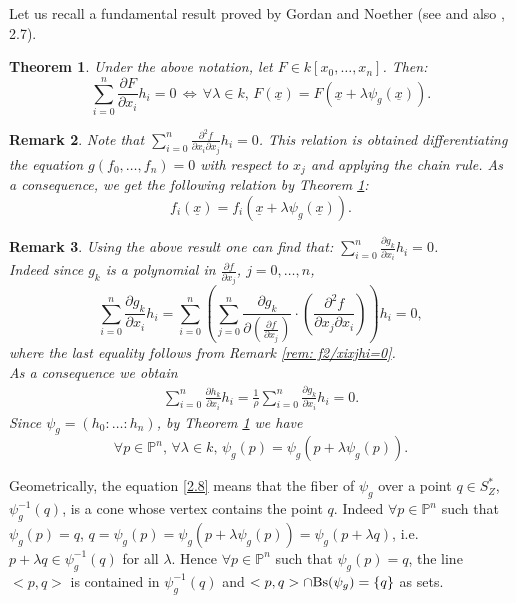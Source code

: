 \documentclass[11pt,a4paper]{amsart}
\newtheorem{theorem}{Theorem}[section]
\newtheorem{rem}[theorem]{Remark}
\begin{document}
\medskip
Let us recall a fundamental result proved by Gordan and Noether (see \cite{Gordan Noether} and also \cite{Lossen}, 2.7).


\begin{theorem}\label{theorem: partial diff }
Under the above notation, let $F\in k[x_0,\ldots ,x_n]$. Then:
\begin{equation}\label{2.7}
\sum_{i=0}^n\frac{\partial F}{\partial x_i}h_i=0\,
\Leftrightarrow\, \forall\lambda\in k, \, F(\underline{x})=F(\underline{x}+\lambda\psi_g(\underline{x})).
\end{equation}
\end{theorem}

\begin{rem}\label{rem: f2/xixjhi=0}{\em
Note that $\sum_{i=0}^n\frac{\partial ^2f}{\partial x_i\partial
x_j}h_i=0$. This relation is obtained differentiating the equation
$g(f_0,\ldots,f_n)=0$ with respect to $x_j$ and applying the chain
rule. As a consequence, we get the following relation by Theorem
\ref{theorem: partial diff }:
\begin{equation}\label{2.5}
   f_i(\underline{x})=f_i(\underline{x}+\lambda\psi_g(\underline{x})).
\end{equation}
}\end{rem}

\begin{rem}\label{rem2.8}{\em Using the above result one can find that:
$\sum_{i=0}^n\frac{\partial g_k}{\partial x_i}h_i=0$.\\
Indeed since $g_k$ is a polynomial in $\frac{\partial f}{\partial
x_j}$, $j=0,\ldots, n$,
$$\sum_{i=0}^n\frac{\partial g_k}{\partial x_i}h_i=\sum_{i=0}^n\left(\sum_{j=0}^n\frac{\partial g_k}{\partial (\frac{\partial f}{\partial x_j})}\cdot \left(\frac{\partial^2f}{\partial x_j \partial x_i}\right)\right)h_i=0,$$
where the last equality follows from Remark \ref{rem:
f2/xixjhi=0}.\\
As a consequence we obtain
\begin{eqnarray}\label{eq: hk/dxi=0}\sum_{i=0}^n\frac{\partial h_k}{\partial
x_i}h_i=\frac{1}{\rho}\sum_{i=0}^n\frac{\partial g_k}{\partial
x_i}h_i=0.\end{eqnarray} Since $\psi_g=(h_0:\ldots: h_n)$, by
Theorem \ref{theorem: partial diff } we have
\begin{equation}\label{2.8}
\forall p\in\mathbb{P}^n,\,  \forall\lambda\in k,\,  \psi_g(p)=\psi_g(p+\lambda\psi_g(p)).
\end{equation}}\end{rem}
Geometrically, the equation \eqref{2.8} means that the fiber of
$\psi_g$ over a point $q\in S^*_Z$, $\psi_g ^{-1}(q)$, is a cone
whose vertex contains the point $q$. Indeed $\forall
p\in\mathbb{P}^n$ such that $\psi_g (p)=q$,
$q=\psi_g(p)=\psi_g(p+\lambda \psi_g(p))=\psi_g(p+\lambda q)$,
i.e. $p+\lambda q\in\psi_g^{-1}(q)$ for all $\lambda$. Hence
$\forall p\in\mathbb{P}^n$ such that $\psi_g (p)=q$, the line
$<p,q>$ is contained in $\psi_g ^{-1}(q)$ and $<p,q>\cap {\rm
Bs}(\psi_g)=\{q\}$ as sets.
\end{document}
